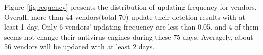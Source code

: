 

Figure \ref{fig:requency} presents the distribution of updating frequency for vendors. Overall, more than 44 vendors(total 70) update their detction results with at least 1 day. Only 6 vendors' updating frequency are less than 0.05, and 4 of them seems not change their antivirus engines during these 75 days. Averagely, about 56 vendors will be updated with at least 2 days. 


